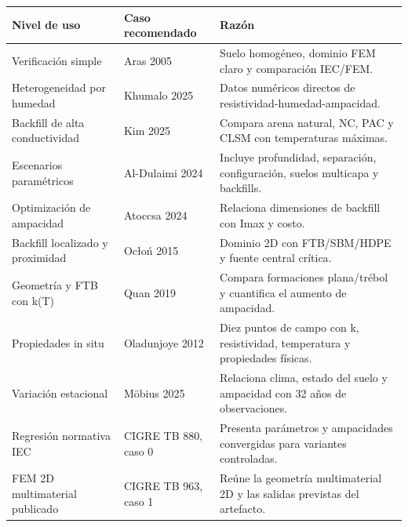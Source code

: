 \documentclass[11pt,a4paper,oneside]{report}
\newcounter{none}
\begin{document}
{\def\LTcaptype{none} %
\begin{longtable}[]{@{}
  >{\raggedright\arraybackslash}p{}
  >{\raggedright\arraybackslash}p{}
  >{\raggedright\arraybackslash}p{}@{}}
\toprule\noalign{}
\begin{minipage}[b]{\linewidth}\raggedright
Nivel de uso
\end{minipage} & \begin{minipage}[b]{\linewidth}\raggedright
Caso recomendado
\end{minipage} & \begin{minipage}[b]{\linewidth}\raggedright
Razón
\end{minipage} \\
\midrule\noalign{}
\endhead
\bottomrule\noalign{}
\endlastfoot
Verificación simple & Aras 2005 & Suelo homogéneo, dominio FEM claro y
comparación IEC/FEM. \\
Heterogeneidad por humedad & Khumalo 2025 & Datos numéricos directos de
resistividad-humedad-ampacidad. \\
Backfill de alta conductividad & Kim 2025 & Compara arena natural, NC,
PAC y CLSM con temperaturas máximas. \\
Escenarios paramétricos & Al-Dulaimi 2024 & Incluye profundidad,
separación, configuración, suelos multicapa y backfills. \\
Optimización de ampacidad & Atoccsa 2024 & Relaciona dimensiones de
backfill con Imax y costo. \\
Backfill localizado y proximidad & Ocłoń 2015 & Dominio 2D con
FTB/SBM/HDPE y fuente central crítica. \\
Geometría y FTB con k(T) & Quan 2019 & Compara formaciones plana/trébol
y cuantifica el aumento de ampacidad. \\
Propiedades in situ & Oladunjoye 2012 & Diez puntos de campo con k,
resistividad, temperatura y propiedades físicas. \\
Variación estacional & Möbius 2025 & Relaciona clima, estado del suelo y
ampacidad con 32 años de observaciones. \\
Regresión normativa IEC & CIGRE TB 880, caso 0 & Presenta parámetros y
ampacidades convergidas para variantes controladas. \\
FEM 2D multimaterial publicado & CIGRE TB 963, caso 1 & Reúne la
geometría multimaterial 2D y las salidas previstas del artefacto. \\

\end{longtable}}
\end{document}
